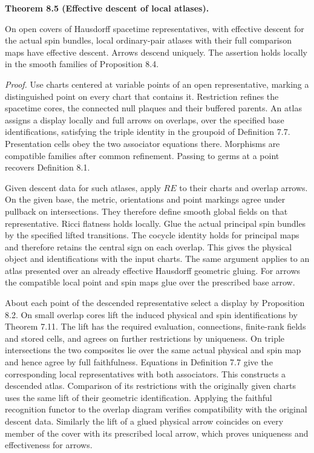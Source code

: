 \documentclass[
  english,
  11pt,
  reqno]{amsart}
\makeatletter
\newcommand{\pandocstatementheading}[1]{%
  \par\addpenalty{\@beginparpenalty}%
  \addvspace{.5\baselineskip plus .2\baselineskip minus .2\baselineskip}%
  {\normalfont\bfseries #1\par}%
  \nobreak\@afterindenttrue\@afterheading
}
\makeatother
\begin{document}
\pandocstatementheading{\leavevmode{}\label{thm:local-display-atlas-descent}Theorem 8.5 (Effective descent of local atlases).}

On open covers of Hausdorff spacetime representatives, with effective
descent for the actual spin bundles, local ordinary-pair atlases with
their full comparison maps have effective descent. Arrows descend
uniquely. The assertion holds locally in the smooth families of
Proposition 8.4.

\emph{Proof.} Use charts centered at variable points of an open
representative, marking a distinguished point on every chart that
contains it. Restriction refines the spacetime cores, the connected null
plaques and their buffered parents. An atlas assigns a display locally
and full arrows on overlaps, over the specified base identifications,
satisfying the triple identity in the groupoid of Definition 7.7.
Presentation cells obey the two associator equations there. Morphisms
are compatible families after common refinement. Passing to germs at a
point recovers Definition 8.1.

Given descent data for such atlases, apply \(R E\) to their charts and
overlap arrows. On the given base, the metric, orientations and point
markings agree under pullback on intersections. They therefore define
smooth global fields on that representative. Ricci flatness holds
locally. Glue the actual principal spin bundles by the specified lifted
transitions. The cocycle identity holds for principal maps and therefore
retains the central sign on each overlap. This gives the physical object
and identifications with the input charts. The same argument applies to
an atlas presented over an already effective Hausdorff geometric gluing.
For arrows the compatible local point and spin maps glue over the
prescribed base arrow.

About each point of the descended representative select a display by
Proposition 8.2. On small overlap cores lift the induced physical and
spin identifications by Theorem 7.11. The lift has the required
evaluation, connections, finite-rank fields and stored cells, and agrees
on further restrictions by uniqueness. On triple intersections the two
composites lie over the same actual physical and spin map and hence
agree by full faithfulness. Equations in Definition 7.7 give the
corresponding local representatives with both associators. This
constructs a descended atlas. Comparison of its restrictions with the
originally given charts uses the same lift of their geometric
identification. Applying the faithful recognition functor to the overlap
diagram verifies compatibility with the original descent data. Similarly
the lift of a glued physical arrow coincides on every member of the
cover with its prescribed local arrow, which proves uniqueness and
effectiveness for arrows.
\end{document}
